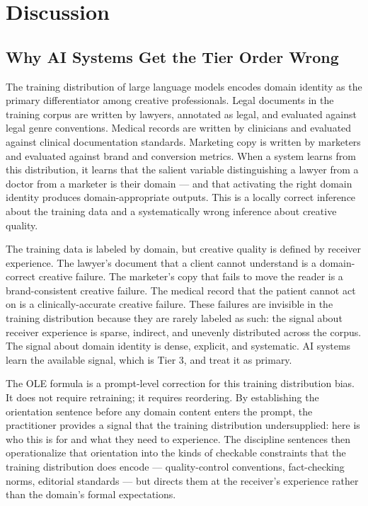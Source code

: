 \section{Discussion}
\label{sec:discussion}

\subsection{Why AI Systems Get the Tier Order Wrong}

The training distribution of large language models encodes domain identity as the primary
differentiator among creative professionals. Legal documents in the training corpus are
written by lawyers, annotated as legal, and evaluated against legal genre conventions.
Medical records are written by clinicians and evaluated against clinical documentation
standards. Marketing copy is written by marketers and evaluated against brand and
conversion metrics. When a system learns from this distribution, it learns that the
salient variable distinguishing a lawyer from a doctor from a marketer is their domain
--- and that activating the right domain identity produces domain-appropriate outputs.
This is a locally correct inference about the training data and a systematically wrong
inference about creative quality.

The training data is labeled by domain, but creative quality is defined by receiver
experience. The lawyer's document that a client cannot understand is a domain-correct
creative failure. The marketer's copy that fails to move the reader is a brand-consistent
creative failure. The medical record that the patient cannot act on is a
clinically-accurate creative failure. These failures are invisible in the training
distribution because they are rarely labeled as such: the signal about receiver experience
is sparse, indirect, and unevenly distributed across the corpus. The signal about domain
identity is dense, explicit, and systematic. AI systems learn the available signal, which
is Tier 3, and treat it as primary.

The OLE formula is a prompt-level correction for this training distribution bias. It does
not require retraining; it requires reordering. By establishing the orientation sentence
before any domain content enters the prompt, the practitioner provides a signal that the
training distribution undersupplied: here is who this is for and what they need to
experience. The discipline sentences then operationalize that orientation into the kinds
of checkable constraints that the training distribution does encode --- quality-control
conventions, fact-checking norms, editorial standards --- but directs them at the
receiver's experience rather than the domain's formal expectations.

